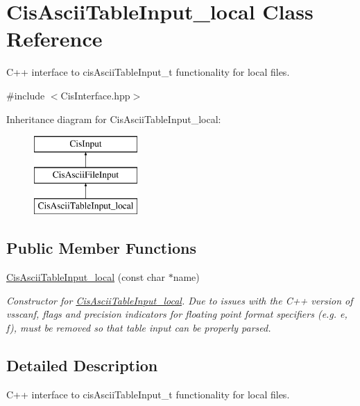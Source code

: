 \hypertarget{classCisAsciiTableInput__local}{}\section{Cis\+Ascii\+Table\+Input\+\_\+local Class Reference}
\label{classCisAsciiTableInput__local}


C++ interface to cis\+Ascii\+Table\+Input\+\_\+t functionality for local files.  




{\ttfamily \#include $<$Cis\+Interface.\+hpp$>$}

Inheritance diagram for Cis\+Ascii\+Table\+Input\+\_\+local\+:\begin{figure}[H]
\begin{center}
\leavevmode
\includegraphics[height=3.000000cm]{classCisAsciiTableInput__local}
\end{center}
\end{figure}
\subsection*{Public Member Functions}
\begin{DoxyCompactItemize}
\item 
\mbox{\hyperlink{classCisAsciiTableInput__local_a1f7f46702f688c571b4c86617ef5035d}{Cis\+Ascii\+Table\+Input\+\_\+local}} (const char $\ast$name)
\begin{DoxyCompactList}\small\item\em Constructor for \mbox{\hyperlink{classCisAsciiTableInput__local}{Cis\+Ascii\+Table\+Input\+\_\+local}}. Due to issues with the C++ version of vsscanf, flags and precision indicators for floating point format specifiers (e.\+g. e, f), must be removed so that table input can be properly parsed. \end{DoxyCompactList}\end{DoxyCompactItemize}


\subsection{Detailed Description}
C++ interface to cis\+Ascii\+Table\+Input\+\_\+t functionality for local files. 

